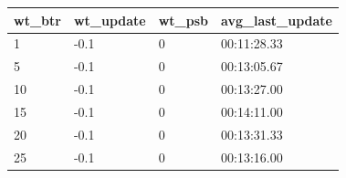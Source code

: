 \begin{table}[]
\begin{tabular}{|l|l|l|l|}
\hline
wt\_btr & wt\_update & wt\_psb & avg\_last\_update \\ \hline
1       & -0.1       & 0       & 00:11:28.33       \\ \hline
5       & -0.1       & 0       & 00:13:05.67       \\ \hline
10      & -0.1       & 0       & 00:13:27.00       \\ \hline
15      & -0.1       & 0       & 00:14:11.00       \\ \hline
20      & -0.1       & 0       & 00:13:31.33       \\ \hline
25      & -0.1       & 0       & 00:13:16.00       \\ \hline
\end{tabular}
\end{table}
